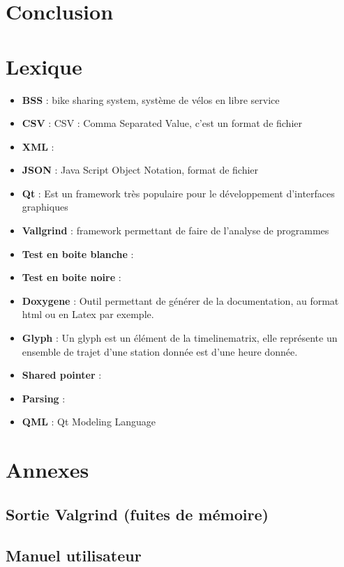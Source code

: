 \documentclass[12pt]{article}
\begin{document}
	\section{Conclusion}

	\newpage
	\section{Lexique}
	\begin{itemize}
		\item[]\textbf{BSS} : bike sharing system, système de vélos en libre service\\
		\item[]\textbf{CSV} : CSV : Comma Separated Value, c'est un format de fichier\\
		\item[]\textbf{XML} :\\
		\item[]\textbf{JSON} : Java Script Object Notation, format de fichier\\
		\item[]\textbf{Qt} : Est un framework très populaire pour le développement
		d'interfaces graphiques\\
		\item[]\textbf{Vallgrind} : framework permettant de faire de l'analyse de programmes\\
		\item[]\textbf{Test en boite blanche} : \\
		\item[]\textbf{Test en boite noire} :  \\
		\item[]\textbf{Doxygene} : Outil permettant de générer de la documentation,
		au format html ou en Latex par exemple.\\
		\item[]\textbf{Glyph} : Un glyph est un élément de la timelinematrix, elle
		représente un ensemble de trajet d'une station donnée est d'une heure donnée.\\
		\item[]\textbf{Shared pointer} :\\
		\item[]\textbf{Parsing} : \\
		\item[]\textbf{QML} : Qt Modeling Language\\
	\end{itemize}

	\newpage
	\listoffigures
	
	\newpage
	\section{Annexes}
		\subsection{Sortie Valgrind (fuites de mémoire)}
		\subsection{Manuel utilisateur}

	\newpage
	
 
\end{document}
